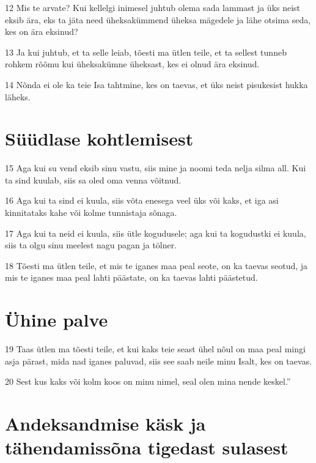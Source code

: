 \par 12 Mis te arvate? Kui kellelgi inimesel juhtub olema sada lammast ja üks neist eksib ära, eks ta jäta need üheksakümmend üheksa mägedele ja lähe otsima seda, kes on ära eksinud?
\par 13 Ja kui juhtub, et ta selle leiab, tõesti ma ütlen teile, et ta sellest tunneb rohkem rõõmu kui üheksakümne üheksast, kes ei olnud ära eksinud.
\par 14 Nõnda ei ole ka teie Isa tahtmine, kes on taevas, et üks neist pisukesist hukka läheks.

\section*{Süüdlase kohtlemisest}

\par 15 Aga kui su vend eksib sinu vastu, siis mine ja noomi teda nelja silma all. Kui ta sind kuulab, siis sa oled oma venna võitnud.
\par 16 Aga kui ta sind ei kuula, siis võta enesega veel üks või kaks, et iga asi kinnitataks kahe või kolme tunnistaja sõnaga.
\par 17 Aga kui ta neid ei kuula, siis ütle kogudusele; aga kui ta kogudustki ei kuula, siis ta olgu sinu meelest nagu pagan ja tölner.
\par 18 Tõesti ma ütlen teile, et mis te iganes maa peal seote, on ka taevas seotud, ja mis te iganes maa peal lahti päästate, on ka taevas lahti päästetud.

\section*{Ühine palve}

\par 19 Taas ütlen ma tõesti teile, et kui kaks teie seast ühel nõul on maa peal mingi asja pärast, mida nad iganes paluvad, siis see saab neile minu Isalt, kes on taevas.
\par 20 Sest kus kaks või kolm koos on minu nimel, seal olen mina nende keskel.”

\section*{Andeksandmise käsk ja tähendamissõna tigedast sulasest}

